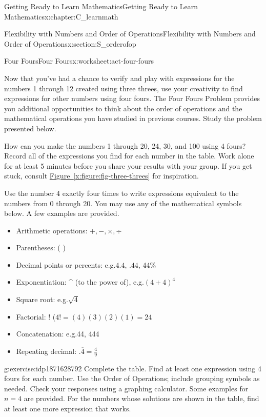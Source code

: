 \documentclass[oneside,10pt,]{book}
\newcommand{\xreffont}{\relax}
\numberwithin{equation}{chapter}
\begin{document}
\begin{chapterptx}{Getting Ready to Learn Mathematics}{}{Getting Ready to Learn Mathematics}{}{}{x:chapter:C_learnmath}
\begin{sectionptx}{Flexibility with Numbers and Order of Operations}{}{Flexibility with Numbers and Order of Operations}{}{}{x:section:S_orderofop}
\begin{worksheet-subsection}{Four Fours}{}{Four Fours}{}{}{x:worksheet:act-four-fours}
\begin{introduction}{}%
Now that you've had a chance to verify and play with expressions for the numbers 1 through 12 created using three threes, use your creativity to find expressions for other numbers using four fours. The Four Fours Problem provides you additional opportunities to think about the order of operations and the mathematical operations you have studied in previous courses. Study the problem presented below.%
\par
How can you make the numbers 1 through 20, 24, 30, and 100 using 4 fours? Record all of the expressions you find for each number in the table. Work alone for at least 5 minutes before you share your results with your group. If you get stuck, consult \hyperref[x:figure:fig-three-threes]{Figure~{\xreffont\ref{x:figure:fig-three-threes}}} for inspiration.%
\par
Use the number 4 exactly four times to write expressions equivalent to the numbers from 0 through 20. You may use any of the mathematical symbols below. A few examples are provided.%
\begin{itemize}[label=\textbullet]
\item{}Arithmetic operations: \(+, -, \times, \div\)%
\item{}Parentheses: ( )%
\item{}Decimal points or percents: e.g.\@ \(4.4\), \(.44\), 44\%%
\item{}Exponentiation: \textasciicircum{} (to the power of), e.g.\@ \((4 + 4)^4\)%
\item{}Square root: e.g.\@ \(\sqrt{4}\)%
\item{}Factorial: ! (\(4! = (4)(3)(2)(1) = 24\)%
\item{}Concatenation: e.g.\@ 44, 444%
\item{}Repeating decimal: \(. \overline{4} = \frac{4}{9}\)%
\end{itemize}
%
\end{introduction}%
\begin{divisionexercise}{1}{}{}{g:exercise:idp1871628792}%
Complete the table. Find at least one expression using 4 fours for each number. Use the Order of Operations; include grouping symbols as needed. Check your responses using a graphing calculator. Some examples for \(n = 4\) are provided. For the numbers whose solutions are shown in the table, find at least one more expression that works.%
\begin{center}%

\end{center}
\end{divisionexercise}
\end{worksheet-subsection}
\end{sectionptx}
\end{chapterptx}
\end{document}
